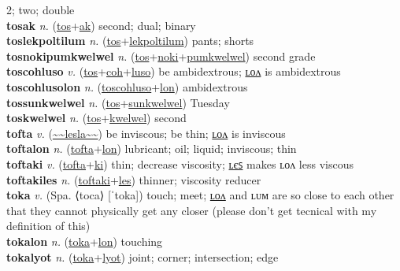 2; two; double \label{tos} \\
\textbf{tosak} \textit{n.} (\hyperref[tos]{tos}+\hyperref[ak]{ak})
second; dual; binary \label{tosak} \\
\textbf{toslekpoltilum} \textit{n.} (\hyperref[tos]{tos}+\hyperref[lekpoltilum]{lekpoltilum})
pants; shorts \label{toslekpoltilum} \\
\textbf{tosnokipumkwelwel} \textit{n.} (\hyperref[tos]{tos}+\hyperref[noki]{noki}+\hyperref[pumkwelwel]{pumkwelwel})
second grade \label{tosnokipumkwelwel} \\
\textbf{toscohluso} \textit{v.} (\hyperref[tos]{tos}+\hyperref[coh]{coh}+\hyperref[luso]{luso})
be ambidextrous; \hyperref[toscohlusolon]{ʟᴏᴧ} is ambidextrous \label{toscohluso} \\
\textbf{toscohlusolon} \textit{n.} (\hyperref[toscohluso]{toscohluso}+\hyperref[lon]{lon})
ambidextrous \label{toscohlusolon} \\
\textbf{tossunkwelwel} \textit{n.} (\hyperref[tos]{tos}+\hyperref[sunkwelwel]{sunkwelwel})
Tuesday \label{tossunkwelwel} \\
\textbf{toskwelwel} \textit{n.} (\hyperref[tos]{tos}+\hyperref[kwelwel]{kwelwel})
second \label{toskwelwel} \\
\textbf{tofta} \textit{v.} (\hyperref[lesla]{\~{}\~{}lesla\~{}\~{}})
be inviscous; be thin; \hyperref[toftalon]{ʟᴏᴧ} is inviscous \label{tofta} \\
\textbf{toftalon} \textit{n.} (\hyperref[tofta]{tofta}+\hyperref[lon]{lon})
lubricant; oil; liquid; inviscous; thin \label{toftalon} \\
\textbf{toftaki} \textit{v.} (\hyperref[tofta]{tofta}+\hyperref[ki]{ki})
thin; decrease viscosity; \hyperref[toftakiles]{ʟєꜱ} makes ʟᴏᴧ less viscous \label{toftaki} \\
\textbf{toftakiles} \textit{n.} (\hyperref[toftaki]{toftaki}+\hyperref[les]{les})
thinner; viscosity reducer \label{toftakiles} \\
\textbf{toka} \textit{v.} (Spa. ⟨toca⟩ [ˈtoka])
touch; meet; \hyperref[tokalon]{ʟᴏᴧ} and ʟᴜᴍ are so close to each other that they cannot physically get any closer (please don't get tecnical with my definition of this) \label{toka} \\
\textbf{tokalon} \textit{n.} (\hyperref[toka]{toka}+\hyperref[lon]{lon})
touching \label{tokalon} \\
\textbf{tokalyot} \textit{n.} (\hyperref[toka]{toka}+\hyperref[lyot]{lyot})
joint; corner; intersection; edge \label{tokalyot} \\
